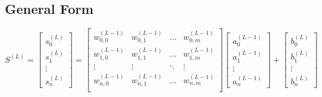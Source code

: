 \begin{flushleft}
                \chapter{General Form}
                    \vspace{0.2cm}
                    \begin{center}
                        $
                        S^{(L)} = 
                        \begin{bmatrix}
                        s^{(L)}_{0} \\
                        s^{(L)}_{1} \\
                        \vdots      \\
                        s^{(L)}_{n} 
                        \end{bmatrix}
                        = 
                        \begin{bmatrix}
                        w^{(L-1)}_{0,0} & w^{(L-1)}_{0,1} & \hdots  & w^{(L-1)}_{0,m} \\
                        w^{(L-1)}_{1,0} & w^{(L-1)}_{1,1} & \hdots  & w^{(L-1)}_{1,m} \\
                        \vdots          & \vdots          & \ddots  & \vdots          \\
                        w^{(L-1)}_{n,0} & w^{(L-1)}_{n,1} & \hdots  & w^{(L-1)}_{n,m} \\
                        \end{bmatrix}
                        \begin{bmatrix}
                        a^{(L-1)}_{0} \\
                        a^{(L-1)}_{1} \\
                        \vdots      \\
                        a^{(L-1)}_{n} 
                        \end{bmatrix}
                        +
                        \begin{bmatrix}
                        b^{(L)}_{0} \\
                        b^{(L)}_{1} \\
                        \vdots      \\
                        b^{(L)}_{n} 
                        \end{bmatrix}
                        $ 


\end{center}
\end{flushleft}
